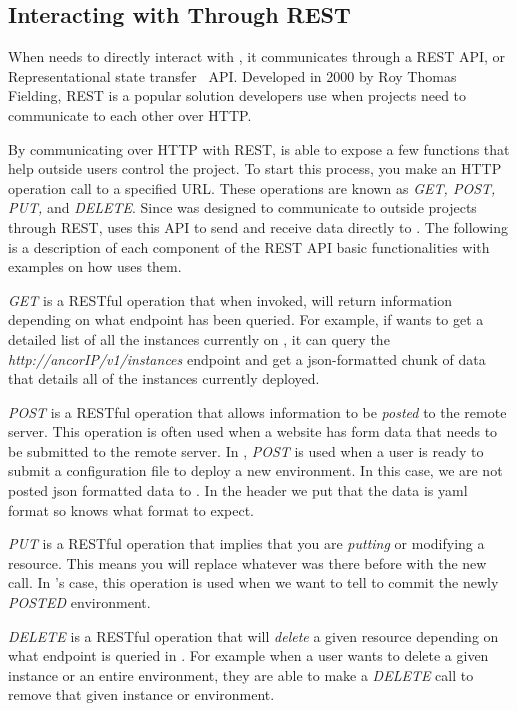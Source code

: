 \subsection{Interacting with \ancor{} Through REST}

When \projectName{} needs to directly interact with \ancor{}, it communicates through a REST API, or Representational state transfer~\cite{DMatrix:Fielding:2000} API. Developed in 2000 by Roy Thomas Fielding, REST is a popular solution developers use when projects need to communicate to each other over HTTP.

By communicating over HTTP with REST, \ancor{} is able to expose a few functions that help outside users control the project. To start this process, you make an HTTP operation call to a specified URL. These operations are known as \emph{GET, POST, PUT,} and \emph{DELETE}. Since \ancor{} was designed to communicate to outside projects through REST, \projectName{} uses this API to send and receive data directly to \ancor{}. The following is a description of each component of the REST API basic functionalities with examples on how \projectName{} uses them.

\emph{GET} is a RESTful operation that when invoked, will return information depending on what endpoint has been queried. For example, if \projectName{} wants to get a detailed list of all the instances currently on \ancor{}, it can query the \emph{http://ancorIP/v1/instances} endpoint and get a json-formatted chunk of data that details all of the instances currently deployed.

\emph{POST} is a RESTful operation that allows information to be \emph{posted} to the remote server. This operation is often used when a website has form data that needs to be submitted to the remote server. In \projectName{}, \emph{POST} is used when a user is ready to submit a configuration file to deploy a new environment. In this case, we are not posted json formatted data to \ancor{}. In the header we put that the data is yaml format so \ancor{} knows what format to expect.

\emph{PUT} is a RESTful operation that implies that you are \emph{putting} or modifying a resource. This means you will replace whatever was there before with the new call. In \projectName{}'s case, this operation is used when we want to tell \ancor{} to commit the newly \emph{POSTED} environment.

\emph{DELETE} is a RESTful operation that will \emph{delete} a given resource depending on what endpoint is queried in \ancor{}. For example when a user wants to delete a given instance or an entire environment, they are able to make a \emph{DELETE} call to remove that given instance or environment.

